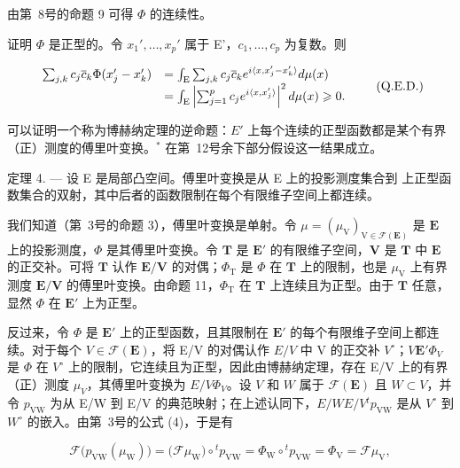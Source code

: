 由第~8号的命题 9 可得 \(\Phi\) 的连续性。

证明 \(\Phi\) 是正型的。令 \(x_1', \ldots, x_p'\) 属于 E'，\(c_1, \ldots, c_p\) 为复数。则

\[
\begin{array}{r l} \sum_ {j, k} c _ {j} \overline {{{c}}} _ {k} \Phi (x _ {j} ^ {\prime} - x _ {k} ^ {\prime}) & = \int_ {\mathrm{E}} \sum_ {j, k} c _ {j} \overline {{{c}}} _ {k} e ^ {i \langle x, x _ {j} ^ {\prime} - x _ {k} ^ {\prime} \rangle} d \mu (x) \\ & = \int_ {\mathrm{E}} \left| \sum_ {j = 1} ^ {p} c _ {j} e ^ {i \langle x, x _ {j} ^ {\prime} \rangle} \right| ^ {2} d \mu (x) \geqslant 0. \end{array}\tag{Q.E.D.}
\]

可以证明一个称为博赫纳定理的逆命题：\(E'\) 上每个连续的正型函数都是某个有界（正）测度的傅里叶变换。\(^{*}\) 在第~12号余下部分假设这一结果成立。

定理 4. --- 设 E 是局部凸空间。傅里叶变换是从 E 上的投影测度集合到  上正型函数集合的双射，其中后者的函数限制在每个有限维子空间上都连续。

我们知道（第~3号的命题 3），傅里叶变换是单射。令 \(\mu = (\mu_{\mathrm{V}})_{\mathrm{V}\in \mathcal{F}(\mathbf{E})}\) 是 \(\mathbf{E}\) 上的投影测度，\(\Phi\) 是其傅里叶变换。令 \(\mathbf{T}\) 是 \(\mathbf{E}'\) 的有限维子空间，\(\mathbf{V}\) 是 \(\mathbf{T}\) 中 \(\mathbf{E}\) 的正交补。可将 \(\mathbf{T}\) 认作 \(\mathbf{E} / \mathbf{V}\) 的对偶；\(\Phi_{\mathrm{T}}\) 是 \(\Phi\) 在 \(\mathbf{T}\) 上的限制，也是 \(\mu_{\mathrm{V}}\) 上有界测度 \(\mathbf{E} / \mathbf{V}\) 的傅里叶变换。由命题 11，\(\Phi_{\mathrm{T}}\) 在 \(\mathbf{T}\) 上连续且为正型。由于 \(\mathbf{T}\) 任意，显然 \(\Phi\) 在 \(\mathbf{E}'\) 上为正型。

反过来，令 \(\Phi\) 是 \(\mathbf{E}'\) 上的正型函数，且其限制在 \(\mathbf{E}'\) 的每个有限维子空间上都连续。对于每个 \(V \in \mathcal{F}(\mathbf{E})\)，将 E/V 的对偶认作 \(E/V\) 中 V 的正交补 \(V^{\circ}\)；\(V\)\(\mathbf{E}'\)\(\Phi_V\) 是 \(\Phi\) 在 \(V^{\circ}\) 上的限制，它连续且为正型，因此由博赫纳定理，存在 E/V 上的有界（正）测度 \(\mu_V\)，其傅里叶变换为 \(E/V\)\(\Phi_V\)。设 \(V\) 和 \(W\) 属于 \(\mathcal{F}(\mathbf{E})\) 且 \(W \subset V\)，并令 \(p_{\mathrm{VW}}\) 为从 E/W 到 E/V 的典范映射；在上述认同下，\(E/W\)\(E/V\)\(^{t}p_{\mathrm{VW}}\) 是从 \(V^{\circ}\) 到 \(W^{\circ}\) 的嵌入。由第~3号的公式 (4)，于是有

\[
\mathcal {F} \big (p _ {\mathrm{VW}} (\mu_ {\mathrm{W}}) \big) = \big (\mathcal {F} \mu_ {\mathrm{W}} \big) \circ {} ^ {t} p _ {\mathrm{VW}} = \Phi_ {\mathrm{W}} \circ {} ^ {t} p _ {\mathrm{VW}} = \Phi_ {\mathrm{V}} = \mathcal {F} \mu_ {\mathrm{V}},
\]

